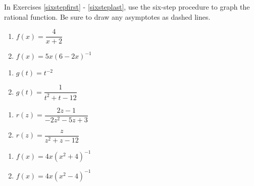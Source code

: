 \documentclass{ximera}
\begin{document}
	\author{Stitz-Zeager}



In Exercises \ref{sixstepfirst} - \ref{sixsteplast}, use the six-step procedure to graph the rational function.  Be sure to draw any asymptotes as dashed lines.

\begin{multicols}{2}
\begin{enumerate}

\item $f(x) = \dfrac{4}{x + 2}$ \label{sixstepfirst}
\item $f(x) = 5x(6-2x)^{-1}$  

\setcounter{HW}{\value{enumi}}
\end{enumerate}
\end{multicols}

\begin{multicols}{2}
\begin{enumerate}
\setcounter{enumi}{\value{HW}}

\item $g(t) = t^{-2}$ 
\item $g(t) = \dfrac{1}{t^{2} + t - 12}$

\setcounter{HW}{\value{enumi}}
\end{enumerate}
\end{multicols}

\begin{multicols}{2}
\begin{enumerate}
\setcounter{enumi}{\value{HW}}

\item $r(z) = \dfrac{2z - 1}{-2z^{2} - 5z + 3}$
\item $r(z) = \dfrac{z}{z^{2} + z - 12}$ 

\setcounter{HW}{\value{enumi}}
\end{enumerate}
\end{multicols}

\begin{multicols}{2}
\begin{enumerate}
\setcounter{enumi}{\value{HW}}

\item $f(x) = 4x(x^2+4)^{-1}$
\item $f(x) = 4x(x^2-4)^{-1}$

\setcounter{HW}{\value{enumi}}
\end{enumerate}
\end{multicols}
\end{document}
